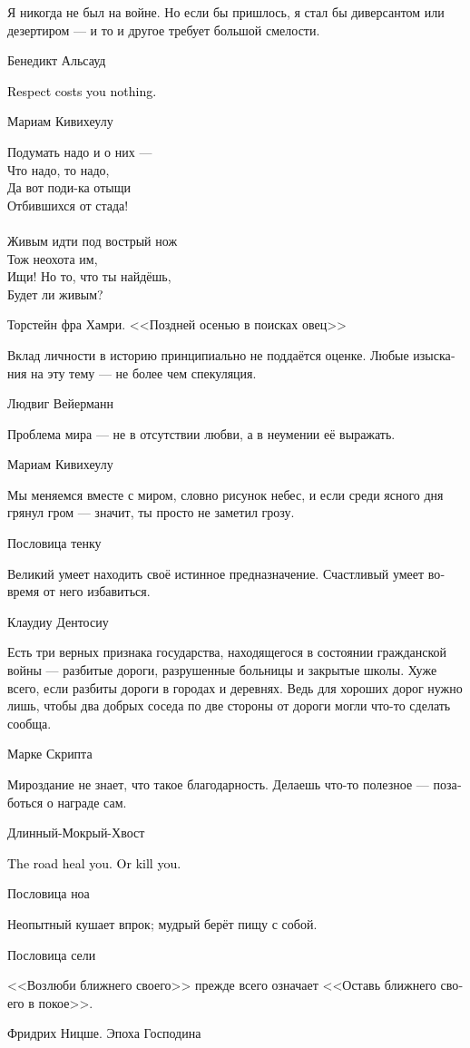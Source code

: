 \documentclass[a4paper,12pt,fleqn]{book}\usepackage{cooltooltips}\usepackage{polyglossia}\setdefaultlanguage[babelshorthands=true]{russian}\setotherlanguage{english}\defaultfontfeatures{Ligatures=TeX,Mapping=tex-text} \usepackage{xcolor}\definecolor{lightgray}{HTML}{bbbbbb}\color{lightgray}\newcommand{\ml}[3]{\textenglish{\textcolor{black}{#3}}}
\begin{document}
{\epigraph
{Я никогда не был на войне.
Но если бы пришлось, я стал бы диверсантом или дезертиром --- и то и другое требует большой смелости.}
{Бенедикт Альсауд}

\epigraph{
\ml{$0$}
{Уважение тебе ничего не стоит.}
{Respect costs you nothing.}
}{Мариам Кивихеулу}

\epigraph
{Подумать надо и о них ---\\
Что надо, то надо,\\
Да вот поди-ка отыщи\\
Отбившихся от стада!\\
~\\
Живым идти под вострый нож\\
Тож неохота им,\\
Ищи! Но то, что ты найдёшь,\\
Будет ли живым?}
{Торстейн фра Хамри.
<<Поздней осенью в поисках овец>>}

\epigraph
{Вклад личности в историю принципиально не поддаётся оценке.
Любые изыскания на эту тему --- не более чем спекуляция.}
{Людвиг Вейерманн}

\epigraph
{Проблема мира --- не в отсутствии любви, а в неумении её выражать.}
{Мариам Кивихеулу}

\epigraph
{Мы меняемся вместе с миром, словно рисунок небес, и если среди ясного дня грянул гром --- значит, ты просто не заметил грозу.}
{Пословица тенку}

\epigraph
{Великий умеет находить своё истинное предназначение.
Счастливый умеет вовремя от него избавиться.}
{Клаудиу Дентосиу}

\epigraph
{Есть три верных признака государства, находящегося в состоянии гражданской войны --- разбитые дороги, разрушенные больницы и закрытые школы.
Хуже всего, если разбиты дороги в городах и деревнях.
Ведь для хороших дорог нужно лишь, чтобы два добрых соседа по две стороны от дороги могли что-то сделать сообща.}
{Марке Скрипта}

\epigraph
{Мироздание не знает, что такое благодарность.
Делаешь что-то полезное --- позаботься о награде сам.}
{Длинный-Мокрый-Хвост}

\epigraph{
\ml{$0$}
{Дорога излечит всё.}
{The road heal you.}
\ml{$0$}
{Или убьёт.}
{Or kill you.}
}{Пословица ноа}

\epigraph
{Неопытный кушает впрок;
мудрый берёт пищу с собой.}
{Пословица сели}

\epigraph
{<<Возлюби ближнего своего>> прежде всего означает <<Оставь ближнего своего в покое>>.}
{Фридрих Ницше.
Эпоха Господина}

}
\end{document}
